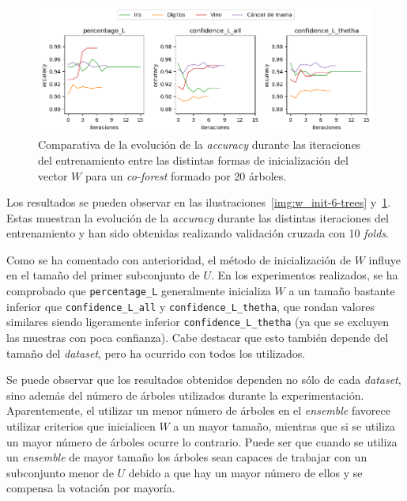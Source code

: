 \begin{figure}[h]
	\caption[\textit{Co-Forest}: resultados (inicialización $W$ con 20 árboles)]{Comparativa de la evolución de la \textit{accuracy} durante las iteraciones del entrenamiento entre las distintas formas de inicialización del vector $W$ para un \textit{co-forest} formado por 20 árboles.}
	\label{img:w_init-20-trees}
	\centering
	\includegraphics[width=\textwidth]{../img/memoria/5_coforest_w-init_rd5_n20}
\end{figure}

Los resultados se pueden observar en las ilustraciones~\ref{img:w_init-6-trees} y~\ref{img:w_init-20-trees}. Estas muestran la evolución de la \textit{accuracy} durante las distintas iteraciones del entrenamiento y han sido obtenidas realizando validación cruzada con 10 \textit{folds}.

Como se ha comentado con anterioridad, el método de inicialización de $W$ influye en el tamaño del primer subconjunto de $U$. En los experimentos realizados, se ha comprobado que \texttt{percentage\_L} generalmente inicializa $W$ a un tamaño bastante inferior que \texttt{confidence\_L\_all} y \texttt{confidence\_L\_thetha}, que rondan valores similares siendo ligeramente inferior \texttt{confidence\_L\_thetha} (ya que se excluyen las muestras con poca confianza). Cabe destacar que esto también depende del tamaño del \textit{dataset}, pero ha ocurrido con todos los utilizados.

Se puede observar que los resultados obtenidos dependen no sólo de cada \textit{dataset}, sino además del número de árboles utilizados durante la experimentación. Aparentemente, el utilizar un menor número de árboles en el \textit{ensemble} favorece utilizar criterios que inicialicen $W$ a un mayor tamaño, mientras que si se utiliza un mayor número de árboles ocurre lo contrario. Puede ser que cuando se utiliza un \textit{ensemble} de mayor tamaño los árboles sean capaces de trabajar con un subconjunto menor de $U$ debido a que hay un mayor número de ellos y se compensa la votación por mayoría.


